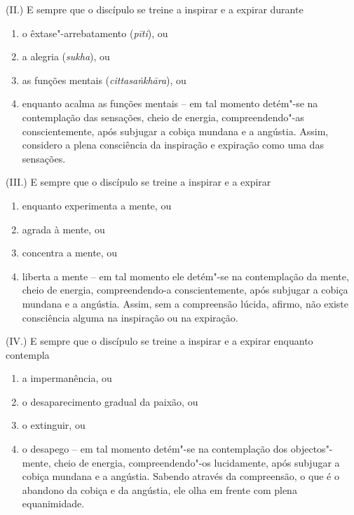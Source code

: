 (II.) E sempre que o discípulo se treine a inspirar e a expirar durante

\begin{enumerate}
  \item o êxtase"-arrebatamento (\emph{pīti}), ou

  \item a alegria (\emph{sukha}), ou

  \item as funções mentais (\emph{cittasaṅkhāra}), ou

  \item enquanto acalma as funções mentais -- em tal momento detém"-se na
        contemplação das sensações, cheio de energia, compreendendo"-as
        conscientemente, após subjugar a cobiça mundana e a angústia. Assim,
        considero a plena consciência da inspiração e expiração como uma das
        sensações.
\end{enumerate}

(III.) E sempre que o discípulo se treine a inspirar e a expirar

\begin{enumerate}
  \item enquanto experimenta a mente, ou

  \item agrada à mente, ou

  \item concentra a mente, ou

  \item liberta a mente -- em tal momento ele detém"-se na contemplação da mente,
        cheio de energia, compreendendo-a conscientemente, após subjugar a
        cobiça mundana e a angústia. Assim, sem a compreensão lúcida, afirmo,
        não existe consciência alguma na inspiração ou na expiração.
\end{enumerate}

(IV.) E sempre que o discípulo se treine a inspirar e a expirar enquanto contempla

\begin{enumerate}
  \item a impermanência, ou

  \item o desaparecimento gradual da paixão, ou

  \item o extinguir, ou

  \item o desapego -- em tal momento detém"-se na contemplação dos
        objectos"-mente, cheio de energia, compreendendo"-os lucidamente, após
        subjugar a cobiça mundana e a angústia. Sabendo através da compreensão,
        o que é o abandono da cobiça e da angústia, ele olha em frente com plena
        equanimidade.
\end{enumerate}

